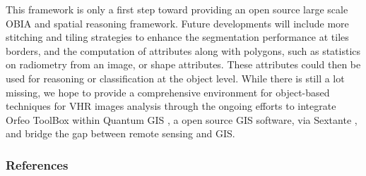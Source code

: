 \documentclass{josis}
\begin{document}
  This framework is only a first step toward providing an open source
 large scale OBIA and spatial reasoning framework. Future developments
 will include more stitching and tiling strategies to enhance the
 segmentation performance at tiles borders, and the computation of
 attributes along with polygons, such as statistics on radiometry from
 an image, or shape attributes. These attributes could then be used
 for reasoning or classification at the object level. While there is
 still a lot missing, we hope to provide a comprehensive environment
 for object-based techniques for VHR images analysis through the
 ongoing efforts to integrate Orfeo ToolBox within Quantum
 GIS \cite{}, a open source GIS software, via Sextante \cite{},
 and bridge the gap between remote sensing and GIS.


\subsubsection{References}



\end{document}
